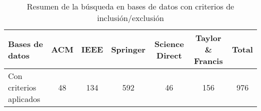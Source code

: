 \begin{table}[H]
\centering
\scriptsize
\setlength{\tabcolsep}{4pt}
\renewcommand{\arraystretch}{1.1}
\begin{tabular}{|l|c|c|c|c|c|c|}
\hline
\textbf{Bases de datos} & \textbf{ACM} & \textbf{IEEE} & \textbf{Springer} & \textbf{Science Direct} & \textbf{Taylor \& Francis} & \textbf{Total} \\
\hline
Con criterios aplicados & 48 & 134 & 592 & 46 & 156 & 976 \\
\hline
\end{tabular}
\caption{Resumen de la búsqueda en bases de datos con criterios de inclusión/exclusión}\label{tab:resumen-busqueda}
\end{table}